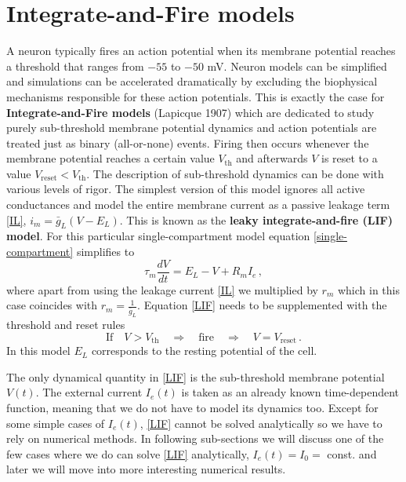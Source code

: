 \documentclass[titlepage]{article}
\begin{document}
\section{Integrate-and-Fire models}

A neuron typically fires an action potential when its membrane potential reaches a threshold that ranges from $-55$ to $-50$ mV. Neuron models can be simplified and simulations can be accelerated dramatically by excluding the biophysical mechanisms responsible for these action potentials. This is exactly the case for \textbf{Integrate-and-Fire models} (Lapicque 1907) which are dedicated to study purely sub-threshold membrane potential dynamics and action potentials are treated just as binary (all-or-none) events. Firing then occurs whenever the membrane potential reaches a certain value $V_{\text{th}}$ and afterwards $V$ is reset to a value $V_{\text{reset}} < V_{\text{th}}$. The description of sub-threshold dynamics can be done with various levels of rigor. The simplest version of this model ignores all active conductances and model the entire membrane current as a passive leakage term \eqref{IL}, $i_m = \bar{g}_L (V - E_L)$. This is known as the \textbf{leaky integrate-and-fire (LIF) model}. For this particular single-compartment model equation \eqref{single-compartment} simplifies to
\begin{equation}\label{LIF}
\tau_m \frac{d V}{d t} = E_L - V + R_m I_e\,,
\end{equation}
where apart from using the leakage current \eqref{IL} we multiplied by $r_m$ which in this case coincides with $r_m = \frac{1}{\bar{g}_L}$. Equation \eqref{LIF} needs to be supplemented with the threshold and reset rules 
\begin{equation}\label{th_and_reset}
\text{If} \quad V > V_{\text{th}} \quad \Rightarrow \quad \text{fire} \quad \Rightarrow \quad V = V_{\text{reset}}\,.
\end{equation}
In this model $E_L$ corresponds to the resting potential of the cell.

The only dynamical quantity in \eqref{LIF} is the sub-threshold membrane potential $V(t)$. The external current $I_e(t)$ is taken as an already known time-dependent function, meaning that we do not have to model its dynamics too. Except for some simple cases of $I_e(t)$, \eqref{LIF} cannot be solved analytically so we have to rely on numerical methods. In following sub-sections we will discuss one of the few cases where we do can solve \eqref{LIF} analytically, $I_e(t) = I_0 = $ const. and later we will move into more interesting numerical results.
\end{document}
